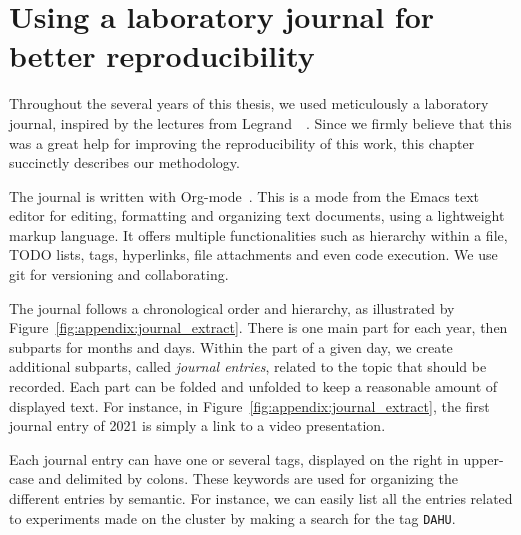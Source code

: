 \chapter{Using a laboratory journal for better reproducibility}
\label{chapter:orgmode}

    Throughout the several years of this thesis, we used meticulously a laboratory journal, inspired by the lectures
    from Legrand~\etal~\cite{RR_mooc,SMPE_course}. Since we firmly believe that this was a great help for improving the
    reproducibility of this work, this chapter succinctly describes our methodology.

    The journal is written with Org-mode~\cite{orgmode}. This is a mode from the Emacs text editor for editing,
    formatting and organizing text documents, using a lightweight markup language. It offers multiple functionalities
    such as hierarchy within a file, TODO lists, tags, hyperlinks, file attachments and even code execution. We use git
    for versioning and collaborating.

    The journal follows a chronological order and hierarchy, as illustrated by
    Figure~\ref{fig:appendix:journal_extract}. There is one main part for each year, then subparts for months and days.
    Within the part of a given day, we create additional subparts, called \emph{journal entries}, related to the topic
    that should be recorded. Each part can be folded and unfolded to keep a reasonable amount of displayed text. For
    instance, in Figure~\ref{fig:appendix:journal_extract}, the first journal entry of 2021 is simply a link to a video
    presentation.

    Each journal entry can have one or several tags, displayed on the right in upper-case and delimited by colons. These
    keywords are used for organizing the different entries by semantic. For instance, we can easily list all the
    entries related to experiments made on the \dahu cluster by making a search for the tag \texttt{DAHU}.

